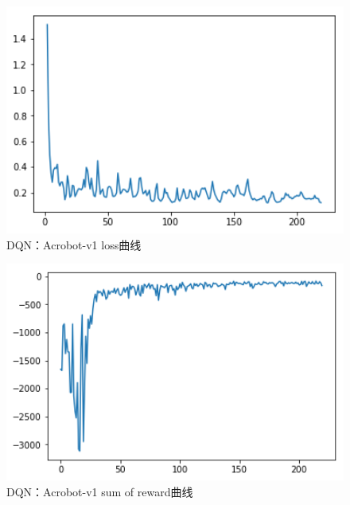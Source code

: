 \documentclass[a4paper,UTF8]{article}
\theoremstyle{definition}
\begin{document}
    \begin{center}
    \begin{figure}[H]
          \centering
          \includegraphics[width=12cm]{22.png}
          \caption{DQN：Acrobot-v1 loss曲线}
          \label{fig:2.3}
    \end{figure}
    \end{center}
    \begin{center}
    \begin{figure}[H]
          \centering
          \includegraphics[width=12cm]{23.png}
          \caption{DQN：Acrobot-v1 sum of reward曲线}
          \label{fig:2.3}
    \end{figure}
    \end{center}
\end{document}
